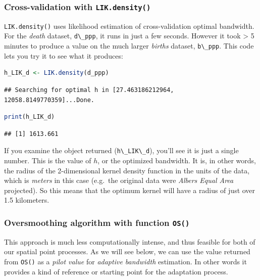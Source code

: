 \documentclass[
]{book}
\newcommand{\passthrough}[1]{#1}
\begin{document}
\hypertarget{cross-validation-with-lik.density}{%
\subsubsection{\texorpdfstring{Cross-validation with \texttt{LIK.density()}}{Cross-validation with LIK.density()}}\label{cross-validation-with-lik.density}}

\passthrough{\lstinline!LIK.density()!} uses likelihood estimation of cross-validation optimal bandwidth. For the \emph{death} dataset, \passthrough{\lstinline!d\_ppp!}, it runs in just a few seconds. However it took \textgreater{} 5 minutes to produce a value on the much larger \emph{births} dataset, \passthrough{\lstinline!b\_ppp!}. This code lets you try it to see what it produces:

\begin{lstlisting}[language=R]
h_LIK_d <- LIK.density(d_ppp)
\end{lstlisting}

\begin{lstlisting}
## Searching for optimal h in [27.463186212964, 12058.8149770359]...Done.
\end{lstlisting}

\begin{lstlisting}[language=R]
print(h_LIK_d)
\end{lstlisting}

\begin{lstlisting}
## [1] 1613.661
\end{lstlisting}

If you examine the object returned (\passthrough{\lstinline!h\_LIK\_d!}), you'll see it is just a single number. This is the value of \(h\), or the optimized bandwidth. It is, in other words, the radius of the 2-dimensional kernel density function in the units of the data, which is \emph{meters} in this case (e.g.~the original data were \emph{Albers Equal Area} projected). So this means that the optimum kernel will have a radius of just over 1.5 kilometers.

\hypertarget{oversmoothing-algorithm-with-function-os}{%
\subsubsection{\texorpdfstring{Oversmoothing algorithm with function \texttt{OS()}}{Oversmoothing algorithm with function OS()}}\label{oversmoothing-algorithm-with-function-os}}

This approach is much less computationally intense, and thus feasible for both of our spatial point processes. As we will see below, we can use the value returned from \passthrough{\lstinline!OS()!} as a \emph{pilot value} for \emph{adaptive bandwidth} estimation. In other words it provides a kind of reference or starting point for the adaptation process.
\end{document}
